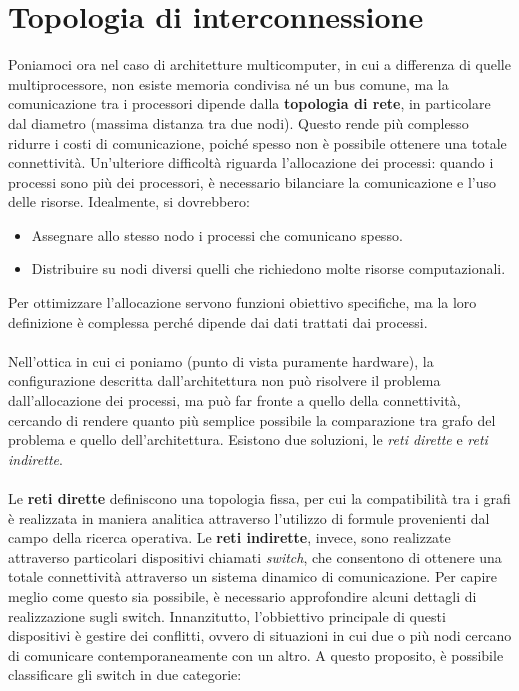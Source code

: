 \section{Topologia di interconnessione}
Poniamoci ora nel caso di architetture multicomputer, in cui a differenza di quelle multiprocessore, non esiste memoria condivisa né un bus comune, ma la comunicazione tra i processori dipende dalla \textbf{topologia di rete}, in particolare dal diametro (massima distanza tra due nodi).
Questo rende più complesso ridurre i costi di comunicazione, poiché spesso non è possibile ottenere una totale connettività. Un'ulteriore difficoltà riguarda l'allocazione dei processi: quando i processi sono più dei processori, è necessario bilanciare la comunicazione e l’uso delle risorse.
Idealmente, si dovrebbero:
\begin{itemize}
    \item Assegnare allo stesso nodo i processi che comunicano spesso.
    \item Distribuire su nodi diversi quelli che richiedono molte risorse computazionali.
\end{itemize}
Per ottimizzare l'allocazione servono funzioni obiettivo specifiche, ma la loro definizione è complessa perché dipende dai dati trattati dai processi.
\\
\\
Nell'ottica in cui ci poniamo (punto di vista puramente hardware), la configurazione descritta 
dall'architettura non può risolvere il problema dall'allocazione dei processi, ma può far fronte a 
quello della connettività, cercando di rendere quanto più semplice possibile la comparazione tra 
grafo del problema e quello dell'architettura.  
Esistono due soluzioni, le \textit{reti dirette} e \textit{reti indirette}.
\\
\\
Le \textbf{reti dirette} definiscono una topologia fissa, per cui la compatibilità tra i grafi è realizzata in maniera analitica attraverso l'utilizzo di formule provenienti dal campo della ricerca operativa. Le \textbf{reti indirette}, invece, sono realizzate attraverso particolari dispositivi chiamati 
\textit{switch}, che consentono di ottenere una totale connettività attraverso un 
sistema dinamico di comunicazione. Per capire meglio come questo sia possibile, è necessario approfondire alcuni dettagli di realizzazione sugli switch. Innanzitutto, l'obbiettivo principale di questi dispositivi è gestire dei conflitti, ovvero di situazioni in cui due o più nodi cercano di comunicare contemporaneamente con un altro. A questo proposito, è possibile classificare gli switch in due categorie:
